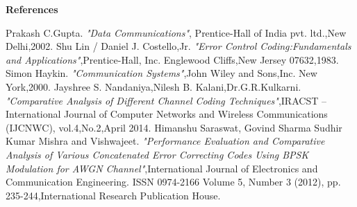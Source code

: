 \documentclass{beamer}
\begin{document}
\begin{frame}{\scriptsize \LARGE \centering \textbf{References}}	
	\begin{block}{}	
		\scriptsize 
		\begin{thebibliography}{50}
		 Prakash C.Gupta. \textsl{"Data Communications"},
Prentice-Hall of India pvt. ltd.,New Delhi,2002.
 Shu Lin / Daniel J. Costello,Jr. \textsl{"Error Control Coding:Fundamentals and Applications"},Prentice-Hall, Inc. Englewood Cliffs,New Jersey 07632,1983.
 Simon Haykin. \textsl{"Communication Systems"},John Wiley and Sons,Inc. New York,2000.
Jayshree S. Nandaniya,Nilesh B. Kalani,Dr.G.R.Kulkarni. \textsl{"Comparative Analysis of Different Channel Coding Techniques"},IRACST – International Journal of Computer Networks and Wireless Communications (IJCNWC), vol.4,No.2,April 2014.
 Himanshu Saraswat, Govind Sharma Sudhir Kumar Mishra and Vishwajeet. \textsl{"Performance Evaluation and Comparative Analysis
of Various Concatenated Error Correcting Codes Using BPSK Modulation for AWGN Channel"},International Journal of Electronics and Communication Engineering.
ISSN 0974-2166 Volume 5, Number 3 (2012), pp. 235-244,International Research Publication House.

\end{thebibliography}
\end{block}
\end{frame}
\end{document}
